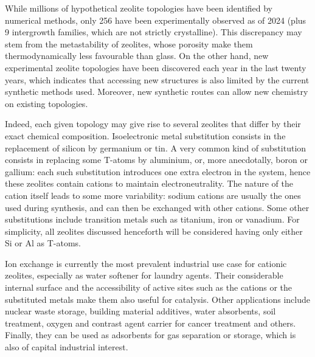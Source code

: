 \documentclass[main.tex]{subfiles}
\begin{document}
While millions of hypothetical zeolite topologies have been identified by numerical methods\autocite{Deem}, only 256 have been experimentally observed as of 2024 (plus 9 intergrowth families, which are not strictly crystalline). This discrepancy may stem from the metastability of zeolites, whose porosity make them thermodynamically less favourable than glass\autocite{ZeoliteStability}. On the other hand, new experimental zeolite topologies have been discovered each year in the last twenty years, which indicates that accessing new structures is also limited by the current synthetic methods used. Moreover, new synthetic routes can allow new chemistry on existing topologies\autocite{ZeoliteSynthesisReviewJihong,ZeoliteSynthesisUnconventionalDusselier}.

Indeed, each given topology may give rise to several zeolites that differ by their exact chemical composition. Isoelectronic metal substitution consists in the replacement of silicon by germanium\autocite{GermaniumZeolites} or tin\autocite{TinZeolites}. A very common kind of substitution consists in replacing some T-atoms by aluminium, or, more anecdotally, boron\autocite{BoronZeolites} or gallium\autocite{GalliumZeolites}: each such substitution introduces one extra electron in the system, hence these zeolites contain cations to maintain electroneutrality. The nature of the cation itself leads to some more variability: sodium cations are usually the ones used during synthesis, and can then be exchanged with other cations\autocite{CationExchangeZeolites,CationsFAUReview}. Some other substitutions include transition metals such as titanium, iron or vanadium\autocite{ExoticZeoliteComposition,TinZeolites}. For simplicity, all zeolites discussed henceforth will be considered having only either Si or Al as T-atoms.

Ion exchange is currently the most prevalent industrial use case for cationic zeolites, especially as water softener for laundry agents\autocite{ZeoliteSynthesisUnconventionalDusselier}. Their considerable internal surface and the accessibility of active sites such as the cations or the substituted metals make them also useful for catalysis\autocite{ExoticZeoliteComposition}. Other applications include nuclear waste storage\autocite{ZeoliteRadioactive}, building material additives\autocite{ZeoliteConcrete}, water absorbents\autocite{ZeoliteWater}, soil treatment\autocite{ZeoliteSoil}, oxygen and contrast agent carrier for cancer treatment\autocite{ZeoliteCancer} and others. Finally, they can be used as adsorbents for gas separation or storage, which is also of capital industrial interest.
\end{document}
